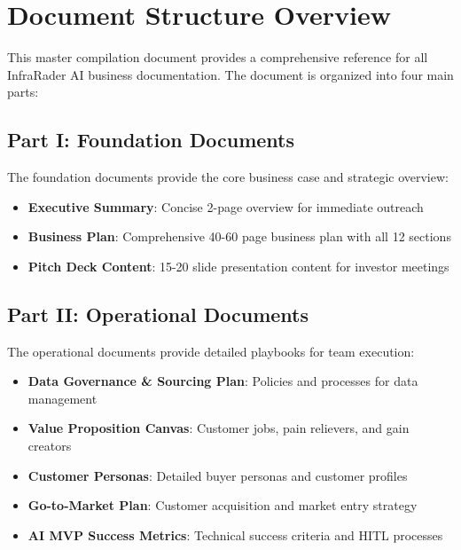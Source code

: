 \documentclass[11pt,a4paper]{book}
\newcommand{\InfraRaderAI}{\textcolor{InfraRaderBlue}{InfraRader AI}}
\begin{document}
\printbibliography[title={References}]

\printindex

\appendix

\chapter{Document Structure Overview}
\label{app:document-structure}

This master compilation document provides a comprehensive reference for all \InfraRaderAI{} business documentation. The document is organized into four main parts:

\section{Part I: Foundation Documents}
The foundation documents provide the core business case and strategic overview:
\begin{itemize}
    \item \textbf{Executive Summary}: Concise 2-page overview for immediate outreach
    \item \textbf{Business Plan}: Comprehensive 40-60 page business plan with all 12 sections
    \item \textbf{Pitch Deck Content}: 15-20 slide presentation content for investor meetings
\end{itemize}

\section{Part II: Operational Documents}
The operational documents provide detailed playbooks for team execution:
\begin{itemize}
    \item \textbf{Data Governance \& Sourcing Plan}: Policies and processes for data management
    \item \textbf{Value Proposition Canvas}: Customer jobs, pain relievers, and gain creators
    \item \textbf{Customer Personas}: Detailed buyer personas and customer profiles
    \item \textbf{Go-to-Market Plan}: Customer acquisition and market entry strategy
    \item \textbf{AI MVP Success Metrics}: Technical success criteria and HITL processes
\end{itemize}
\end{document}
